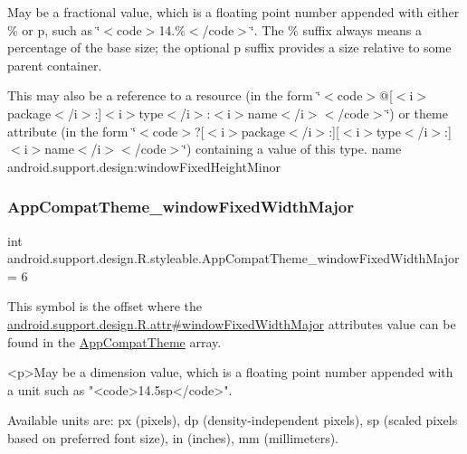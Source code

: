 May be a fractional value, which is a floating point number appended with either \% or p, such as \char`\"{}$<$code$>$14.\%$<$/code$>$\char`\"{}. The \% suffix always means a percentage of the base size; the optional p suffix provides a size relative to some parent container. 

This may also be a reference to a resource (in the form \char`\"{}$<$code$>$@\mbox{[}$<$i$>$package$<$/i$>$\+:\mbox{]}$<$i$>$type$<$/i$>$\+:$<$i$>$name$<$/i$>$$<$/code$>$\char`\"{}) or theme attribute (in the form \char`\"{}$<$code$>$?\mbox{[}$<$i$>$package$<$/i$>$\+:\mbox{]}\mbox{[}$<$i$>$type$<$/i$>$\+:\mbox{]}$<$i$>$name$<$/i$>$$<$/code$>$\char`\"{}) containing a value of this type.  name android.\+support.\+design\+:window\+Fixed\+Height\+Minor \mbox{\label{classandroid_1_1support_1_1design_1_1R_1_1styleable_ab12b360d277ad1c88a3ee93ff645a047}} 
\subsubsection{\texorpdfstring{App\+Compat\+Theme\+\_\+window\+Fixed\+Width\+Major}{AppCompatTheme\_windowFixedWidthMajor}}
{\footnotesize\ttfamily int android.\+support.\+design.\+R.\+styleable.\+App\+Compat\+Theme\+\_\+window\+Fixed\+Width\+Major = 6\hspace{0.3cm}{\ttfamily [static]}}

This symbol is the offset where the \hyperlink{classandroid_1_1support_1_1design_1_1R_1_1attr_a1fcd76e231eda73c25225c029aa4ef39}{android.\+support.\+design.\+R.\+attr\#window\+Fixed\+Width\+Major} attribute\textquotesingle{}s value can be found in the \hyperlink{classandroid_1_1support_1_1design_1_1R_1_1styleable_afb351dc8de20cbd4c89abe360373010c}{App\+Compat\+Theme} array.

\begin{DoxyVerb}      <p>May be a dimension value, which is a floating point number appended with a unit such as "<code>14.5sp</code>".
\end{DoxyVerb}
 Available units are\+: px (pixels), dp (density-\/independent pixels), sp (scaled pixels based on preferred font size), in (inches), mm (millimeters). 

